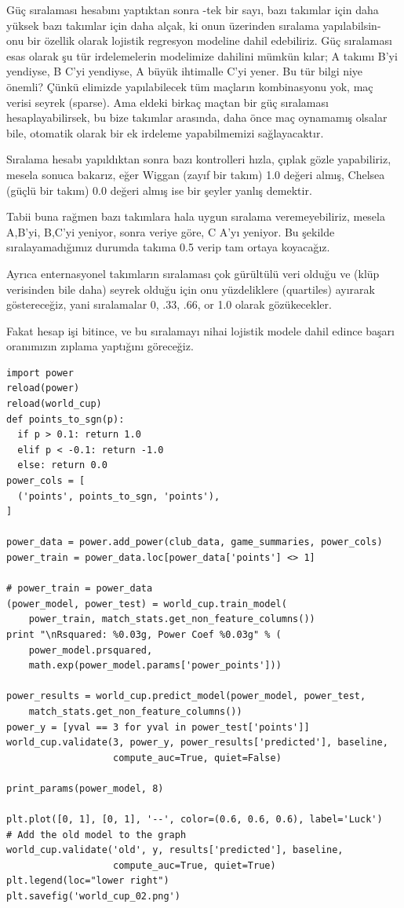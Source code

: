 \documentclass[12pt,fleqn]{article}\usepackage{../../common}
\begin{document}
Güç sıralaması hesabını yaptıktan sonra -tek bir sayı, bazı takımlar için daha
yüksek bazı takımlar için daha alçak, ki onun üzerinden sıralama yapılabilsin-
onu bir özellik olarak lojistik regresyon modeline dahil edebiliriz. Güç
sıralaması esas olarak şu tür irdelemelerin modelimize dahilini mümkün kılar; A
takımı B'yi yendiyse, B C'yi yendiyse, A büyük ihtimalle C'yi yener. Bu tür
bilgi niye önemli?  Çünkü elimizde yapılabilecek tüm maçların kombinasyonu yok,
maç verisi seyrek (sparse). Ama eldeki birkaç maçtan bir güç sıralaması
hesaplayabilirsek, bu bize takımlar arasında, daha önce maç oynamamış olsalar
bile, otomatik olarak bir ek irdeleme yapabilmemizi sağlayacaktır.

Sıralama hesabı yapıldıktan sonra bazı kontrolleri hızla, çıplak gözle
yapabiliriz, mesela sonuca bakarız, eğer Wiggan (zayıf bir takım) 1.0
değeri almış, Chelsea (güçlü bir takım) 0.0 değeri almış ise bir şeyler
yanlış demektir.

Tabii buna rağmen bazı takımlara hala uygun sıralama veremeyebiliriz,
mesela A,B'yi, B,C'yi yeniyor, sonra veriye göre, C A'yı yeniyor. Bu
şekilde sıralayamadığımız durumda takıma 0.5 verip tam ortaya koyacağız.

Ayrıca enternasyonel takımların sıralaması çok gürültülü veri olduğu ve
(klüp verisinden bile daha) seyrek olduğu için onu yüzdeliklere (quartiles)
ayırarak göstereceğiz, yani sıralamalar 0, .33, .66, or 1.0 olarak
gözükecekler.

Fakat hesap işi bitince, ve bu sıralamayı nihai lojistik modele dahil
edince başarı oranımızın zıplama yaptığını göreceğiz.

\begin{verbatim}
import power
reload(power)
reload(world_cup)
def points_to_sgn(p):
  if p > 0.1: return 1.0
  elif p < -0.1: return -1.0
  else: return 0.0
power_cols = [
  ('points', points_to_sgn, 'points'),
]

power_data = power.add_power(club_data, game_summaries, power_cols)
power_train = power_data.loc[power_data['points'] <> 1] 

# power_train = power_data
(power_model, power_test) = world_cup.train_model(
    power_train, match_stats.get_non_feature_columns())
print "\nRsquared: %0.03g, Power Coef %0.03g" % (
    power_model.prsquared, 
    math.exp(power_model.params['power_points']))

power_results = world_cup.predict_model(power_model, power_test, 
    match_stats.get_non_feature_columns())
power_y = [yval == 3 for yval in power_test['points']]
world_cup.validate(3, power_y, power_results['predicted'], baseline, 
                   compute_auc=True, quiet=False)

print_params(power_model, 8)

plt.plot([0, 1], [0, 1], '--', color=(0.6, 0.6, 0.6), label='Luck')
# Add the old model to the graph
world_cup.validate('old', y, results['predicted'], baseline, 
                   compute_auc=True, quiet=True)
plt.legend(loc="lower right")
plt.savefig('world_cup_02.png')
\end{verbatim}
\end{document}
